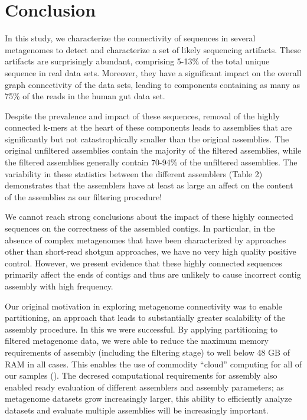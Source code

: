 \documentclass[10pt]{article}
\begin{document}
\section*{Conclusion}

In this study, we characterize the connectivity of sequences in
several metagenomes to detect and characterize a set of likely
sequencing artifacts.  These artifacts are surprisingly abundant,
comprising 5-13\% of the total unique sequence in real data sets.
Moreover, they have a significant impact on the overall graph
connectivity of the data sets, leading to components containing as
many as 75\% of the reads in the human gut data set.

Despite the prevalence and impact of these sequences, removal of the
highly connected k-mers at the heart of these components leads to
assemblies that are significantly but not catastrophically smaller
than the original assemblies.  The original unfiltered assemblies
contain the majority of the filtered assemblies, while the filtered
assemblies generally contain 70-94\% of the unfiltered assemblies.
The variability in these statistics between the different assemblers
(Table 2) demonstrates that the assemblers have at least as large an
affect on the content of the assemblies as our filtering procedure!

We cannot reach strong conclusions about the impact of these highly
connected sequences on the correctness of the assembled contigs.  In
particular, in the absence of complex metagenomes that have been
characterized by approaches other than short-read shotgun approaches,
we have no very high quality positive control.  However, we present
evidence that these highly connected sequences primarily affect the
ends of contigs and thus are unlikely to cause incorrect contig
assembly with high frequency.

Our original motivation in exploring metagenome connectivity was to
enable partitioning, an approach that leads to substantially greater
scalability of the assembly procedure.  In this we were successful.
By applying partitioning to filtered metagenome data, we were able to
reduce the maximum memory requirements of assembly (including the
filtering stage) to well below 48 GB of RAM in all cases.  This
enables the use of commodity ``cloud'' computing for all of our
samples (\cite{Angiuoli:2011hd}).  The decresed computational
requirements for assembly also enabled ready evaluation of different
assemblers and assembly parameters; as metagenome datasets grow
increasingly larger, this ability to efficiently analyze datasets and
evaluate multiple assemblies will be increasingly important.
\end{document}
